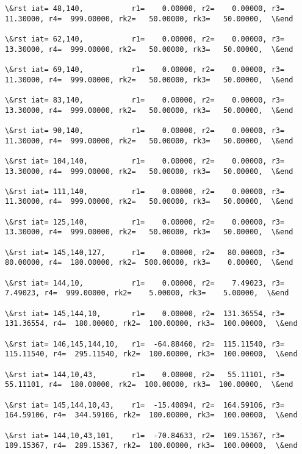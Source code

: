 \documentclass[11pt]{article}
\begin{document}
\begin{Verbatim}[commandchars=\\\{\}]
\&rst iat= 48,140,           r1=    0.00000, r2=    0.00000, r3=   11.30000, r4=  999.00000, rk2=   50.00000, rk3=   50.00000,  \&end

\&rst iat= 62,140,           r1=    0.00000, r2=    0.00000, r3=   13.30000, r4=  999.00000, rk2=   50.00000, rk3=   50.00000,  \&end

\&rst iat= 69,140,           r1=    0.00000, r2=    0.00000, r3=   11.30000, r4=  999.00000, rk2=   50.00000, rk3=   50.00000,  \&end

\&rst iat= 83,140,           r1=    0.00000, r2=    0.00000, r3=   13.30000, r4=  999.00000, rk2=   50.00000, rk3=   50.00000,  \&end

\&rst iat= 90,140,           r1=    0.00000, r2=    0.00000, r3=   11.30000, r4=  999.00000, rk2=   50.00000, rk3=   50.00000,  \&end

\&rst iat= 104,140,          r1=    0.00000, r2=    0.00000, r3=   13.30000, r4=  999.00000, rk2=   50.00000, rk3=   50.00000,  \&end

\&rst iat= 111,140,          r1=    0.00000, r2=    0.00000, r3=   11.30000, r4=  999.00000, rk2=   50.00000, rk3=   50.00000,  \&end

\&rst iat= 125,140,          r1=    0.00000, r2=    0.00000, r3=   13.30000, r4=  999.00000, rk2=   50.00000, rk3=   50.00000,  \&end

\&rst iat= 145,140,127,      r1=    0.00000, r2=   80.00000, r3=   80.00000, r4=  180.00000, rk2=  500.00000, rk3=    0.00000,  \&end

\&rst iat= 144,10,           r1=    0.00000, r2=    7.49023, r3=    7.49023, r4=  999.00000, rk2=    5.00000, rk3=    5.00000,  \&end

\&rst iat= 145,144,10,       r1=    0.00000, r2=  131.36554, r3=  131.36554, r4=  180.00000, rk2=  100.00000, rk3=  100.00000,  \&end

\&rst iat= 146,145,144,10,   r1=  -64.88460, r2=  115.11540, r3=  115.11540, r4=  295.11540, rk2=  100.00000, rk3=  100.00000,  \&end

\&rst iat= 144,10,43,        r1=    0.00000, r2=   55.11101, r3=   55.11101, r4=  180.00000, rk2=  100.00000, rk3=  100.00000,  \&end

\&rst iat= 145,144,10,43,    r1=  -15.40894, r2=  164.59106, r3=  164.59106, r4=  344.59106, rk2=  100.00000, rk3=  100.00000,  \&end

\&rst iat= 144,10,43,101,    r1=  -70.84633, r2=  109.15367, r3=  109.15367, r4=  289.15367, rk2=  100.00000, rk3=  100.00000,  \&end


\end{Verbatim}
\end{document}
